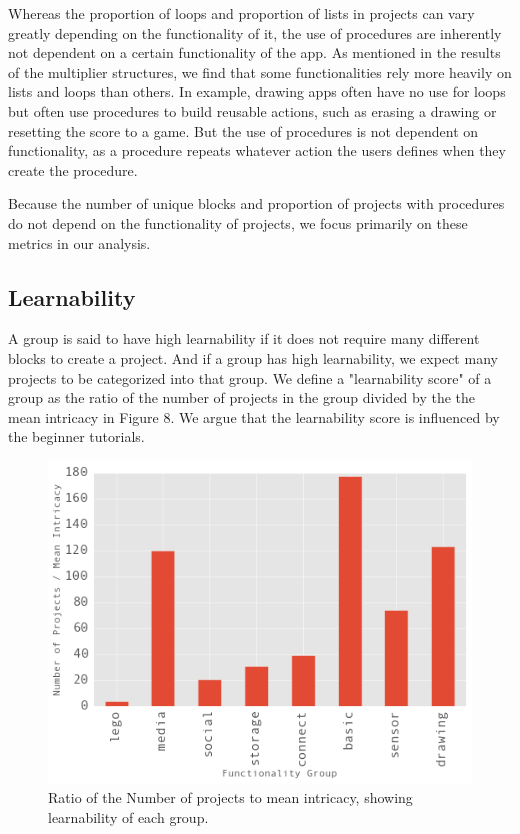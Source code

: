 \documentclass[conference]{IEEEtran}
\begin{document}
Whereas the proportion of loops and proportion of lists in projects can vary greatly depending on the functionality of it, the use of procedures are inherently not dependent on a certain functionality of the app. As mentioned in the results of the multiplier structures, we find that some functionalities rely more heavily on lists and loops than others. In example, drawing apps often have no use for loops but often use procedures to build reusable actions, such as erasing a drawing or resetting the score to a game. But the use of procedures is not dependent on functionality, as a procedure repeats whatever action the users defines when they create the procedure.

Because the number of unique blocks and proportion of projects with procedures do not depend on the functionality of projects, we focus primarily on these metrics in our analysis.

\subsection{Learnability}
A group is said to have high learnability if it does not require many different blocks to create a project. And if a group has high learnability, we expect many projects to be categorized into that group. We define a "learnability score" of a group as the ratio of the number of projects in the group divided by the the mean intricacy in Figure 8.  We argue that the learnability score is influenced by the beginner tutorials.

\begin{figure}[h!]
	\centering
	\includegraphics[width=1\linewidth]{learnability_score.png}
	\caption{Ratio of the Number of projects to mean intricacy, showing learnability of each group.}
	\label{LearnabilityScore}
\end{figure}
\end{document}

